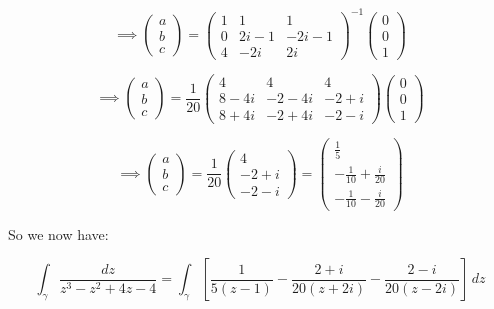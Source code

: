 \documentclass[12pt]{article}
\begin{document}
\begin{enumerate}[label=\textbf{(\roman*)}]
\[
\implies 
\begin{pmatrix}
a \\
b \\
c
\end{pmatrix}
=
\begin{pmatrix}
1 & 1 & 1 \\
0 & 2i - 1 & -2i - 1 \\
4 & -2i & 2i
\end{pmatrix}^{-1}
\begin{pmatrix}
0 \\
0 \\
1
\end{pmatrix}
\]

\[
\implies \begin{pmatrix}
    a \\
    b \\
    c
    \end{pmatrix}
    =\frac{1}{20}
    \begin{pmatrix}
    4 & 4 & 4 \\
    8-4i &-2-4i & -2+i \\
    8+4i & -2+4i & -2-i 
    \end{pmatrix}
    \begin{pmatrix}
    0 \\
    0 \\
    1
    \end{pmatrix}
\]



\[
\implies \begin{pmatrix}
    a \\
    b \\
    c
    \end{pmatrix}
    =\frac{1}{20}
    \begin{pmatrix}
    4 \\
    -2+i \\
    -2-i 
    \end{pmatrix}
    =
    \begin{pmatrix}
       \frac{1}{5} \\
        -\frac{1}{10}+\frac{i}{20} \\
        -\frac{1}{10}-\frac{i}{20} 
        \end{pmatrix}
\]

So we now have:

\[
\int_{\gamma} \frac{dz}{z^3 - z^2 + 4z - 4} = \int_{\gamma} \left[\frac{1}{5\left(z-1\right)} - \frac{2+i}{20\left(z+2i\right)} - \frac{2-i}{20\left(z-2i\right)}\right] \, dz
\]


\end{enumerate}
\end{document}

